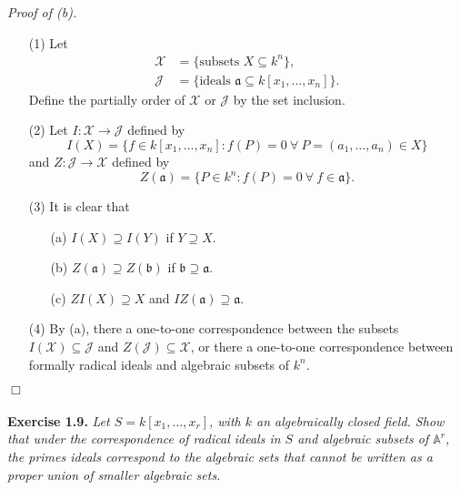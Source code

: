 \documentclass{article}
\begin{document}
\emph{Proof of (b).}
\begin{enumerate}
  \item[(1)]
  Let
  \begin{align*}
    \mathcal{X} &= \{ \text{subsets } X \subseteq k^n \}, \\
    \mathcal{J} &= \{ \text{ideals } \mathfrak{a} \subseteq k[x_1,\ldots,x_n] \}.
  \end{align*}
  Define the partially order of $\mathcal{X}$ or $\mathcal{J}$ by the set inclusion.
  \item[(2)]
  Let $I: \mathcal{X} \to \mathcal{J}$ defined by
  \[
    I(X)
    = \{ f \in k[x_1,\ldots,x_n] : f(P) = 0
      \: \forall \: P = (a_1, \ldots, a_n) \in X \}
  \]
  and $Z: \mathcal{J} \to \mathcal{X}$ defined by
  \[
    Z(\mathfrak{a})
    = \{ P \in k^n : f(P) = 0
      \: \forall \: f \in \mathfrak{a} \}.
  \]
  \item[(3)]
  It is clear that
    \begin{enumerate}
    \item[(a)]
      $I(X) \supseteq I(Y)$ if $Y \supseteq X$.
    \item[(b)]
      $Z(\mathfrak{a}) \supseteq Z(\mathfrak{b})$ if $\mathfrak{b} \supseteq \mathfrak{a}$.
    \item[(c)]
      $ZI(X) \supseteq X$ and $IZ(\mathfrak{a}) \supseteq \mathfrak{a}$.
    \end{enumerate}
  \item[(4)]
  By (a),
  there a one-to-one correspondence between
  the subsets $I(\mathcal{X}) \subseteq \mathcal{J}$ and $Z(\mathcal{J}) \subseteq \mathcal{X}$,
  or there a one-to-one correspondence between
  formally radical ideals and algebraic subsets of $k^n$.
\end{enumerate}
$\Box$ \\\\






\textbf{Exercise 1.9.}
\emph{Let $S = k[x_1,\ldots,x_r]$, with $k$ an algebraically closed field.
Show that under the correspondence of radical ideals in $S$ and
algebraic subsets of $\mathbb{A}^r$,
the primes ideals correspond to the algebraic sets that
cannot be written as a proper union of smaller algebraic sets.} \\
\end{document}
